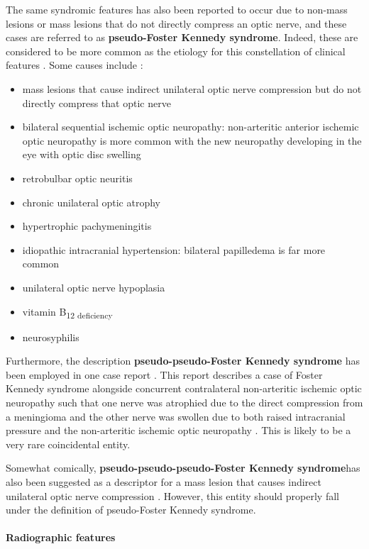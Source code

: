 The same syndromic features has also been reported to occur due to non-mass lesions or mass lesions that do not directly compress an optic nerve, and these cases are referred to as \textbf{pseudo-Foster Kennedy syndrome}. Indeed, these are considered to be more common as the etiology for this constellation of clinical features . Some causes include :

\begin{itemize}
	\item
	mass lesions that cause indirect unilateral optic nerve compression but do not directly compress that optic nerve
	\item
	bilateral sequential ischemic optic neuropathy: non-arteritic anterior ischemic optic neuropathy is more common with the new neuropathy developing in the eye with optic disc swelling
	\item
	retrobulbar optic neuritis
	\item
	chronic unilateral optic atrophy
	\item
	hypertrophic pachymeningitis
	\item
	idiopathic intracranial hypertension: bilateral papilledema is far more common
	\item
	unilateral optic nerve hypoplasia
	\item
	vitamin B\textsubscript{12 deficiency}
	\item
	neurosyphilis
\end{itemize}

Furthermore, the description \textbf{pseudo-pseudo-Foster Kennedy syndrome} has been employed in one case report . This report describes a case of Foster Kennedy syndrome alongside concurrent contralateral non-arteritic ischemic optic neuropathy such that one nerve was atrophied due to the direct compression from a meningioma and the other nerve was swollen due to both raised intracranial pressure and the non-arteritic ischemic optic neuropathy . This is likely to be a very rare coincidental entity.

Somewhat comically, \textbf{pseudo-pseudo-pseudo-Foster Kennedy syndrome}has also been suggested as a descriptor for a mass lesion that causes indirect unilateral optic nerve compression . However, this entity should properly fall under the definition of pseudo-Foster Kennedy syndrome.

\paragraph{Radiographic features}

